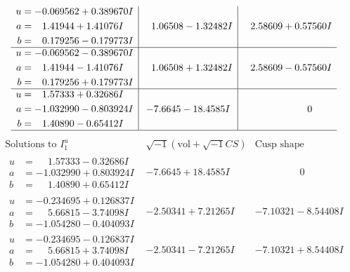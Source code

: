 \documentclass[1p]{elsarticle_modified}
\theoremstyle{definition}
\newcommand{\I}{\sqrt{-1}}
\begin{document}
$$\begin{array}{c|c|c}
\begin{aligned}
u &= -0.069562 + 0.389670 I \\
a &= \phantom{-}1.41944 + 1.41076 I \\
b &= \phantom{-}0.179256 - 0.179773 I\end{aligned}
 & \phantom{-}1.06508 - 1.32482 I & \phantom{-}2.58609 + 0.57560 I \\ \hline\begin{aligned}
u &= -0.069562 - 0.389670 I \\
a &= \phantom{-}1.41944 - 1.41076 I \\
b &= \phantom{-}0.179256 + 0.179773 I\end{aligned}
 & \phantom{-}1.06508 + 1.32482 I & \phantom{-}2.58609 - 0.57560 I \\ \hline\begin{aligned}
u &= \phantom{-}1.57333 + 0.32686 I \\
a &= -1.032990 - 0.803924 I \\
b &= \phantom{-}1.40890 - 0.65412 I\end{aligned}
 & -7.6645 - 18.4585 I & \phantom{-0.000000 } 0\\
 \hline 
 \end{array}$$\newpage$$\begin{array}{c|c|c}  
\text{Solutions to }I^u_{1}& \I (\text{vol} + \sqrt{-1}CS) & \text{Cusp shape}\\
 \hline 
\begin{aligned}
u &= \phantom{-}1.57333 - 0.32686 I \\
a &= -1.032990 + 0.803924 I \\
b &= \phantom{-}1.40890 + 0.65412 I\end{aligned}
 & -7.6645 + 18.4585 I & \phantom{-0.000000 } 0 \\ \hline\begin{aligned}
u &= -0.234695 + 0.126837 I \\
a &= \phantom{-}5.66815 - 3.74098 I \\
b &= -1.054280 - 0.404093 I\end{aligned}
 & -2.50341 + 7.21265 I & -7.10321 - 8.54408 I \\ \hline\begin{aligned}
u &= -0.234695 - 0.126837 I \\
a &= \phantom{-}5.66815 + 3.74098 I \\
b &= -1.054280 + 0.404093 I\end{aligned}
 & -2.50341 - 7.21265 I & -7.10321 + 8.54408 I \\ \hline\begin{aligned}

\end{aligned}
\end{array}$$
\end{document}
